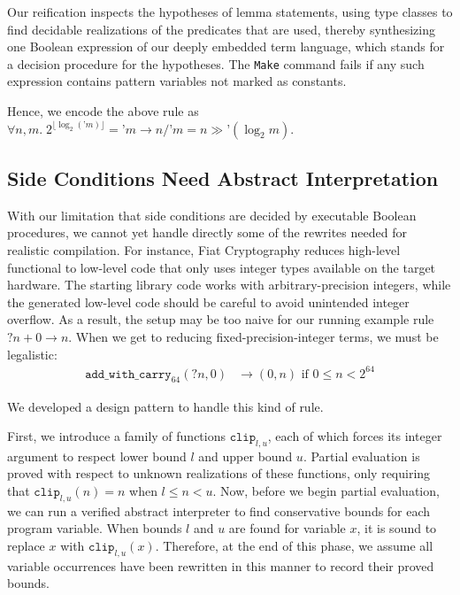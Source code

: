 \documentclass[a4paper,USenglish,cleveref,autoref,thm-restate]{lipics-v2021}
\begin{document}
Our reification inspects the hypotheses of lemma statements, using type classes to find decidable realizations of the predicates that are used, thereby synthesizing one Boolean expression of our deeply embedded term language, which stands for a decision procedure for the hypotheses.
The \texttt{Make} command fails if any such expression contains pattern variables not marked as constants.

Hence, we encode the above rule as $\forall n, m. \; 2^{\lfloor \log_2(\texttt{'}m)\rfloor} = \texttt{'}m \to n / \texttt{'}m = n \gg \texttt{'}(\log_2 m)$.

\subsection{Side Conditions Need Abstract Interpretation}\label{sec:abs-int}

With our limitation that side conditions are decided by executable Boolean procedures, we cannot yet handle directly some of the rewrites needed for realistic compilation.
For instance, Fiat Cryptography reduces high-level functional to low-level code that only uses integer types available on the target hardware.
The starting library code works with arbitrary-precision integers, while the generated low-level code should be careful to avoid unintended integer overflow.
As a result, the setup may be too naive for our running example rule ${?n} + 0 \to n$.
When we get to reducing fixed-precision-integer terms, we must be legalistic:
\begin{align*}
  \texttt{add\_with\_carry}_{64}({?n}, 0) & \to (0, n)\text{\ \ if\ \ }0 \le n < 2^{64}
\end{align*}

We developed a design pattern to handle this kind of rule.

First, we introduce a family of functions $\texttt{clip}_{l,u}$, each of which forces its integer argument to respect lower bound $l$ and upper bound $u$.
Partial evaluation is proved with respect to unknown realizations of these functions, only requiring that $\texttt{clip}_{l, u}(n) = n$ when $l \leq n < u$.
Now, before we begin partial evaluation, we can run a verified abstract interpreter to find conservative bounds for each program variable.
When bounds $l$ and $u$ are found for variable $x$, it is sound to replace $x$ with $\texttt{clip}_{l,u}(x)$.
Therefore, at the end of this phase, we assume all variable occurrences have been rewritten in this manner to record their proved bounds.
\end{document}
